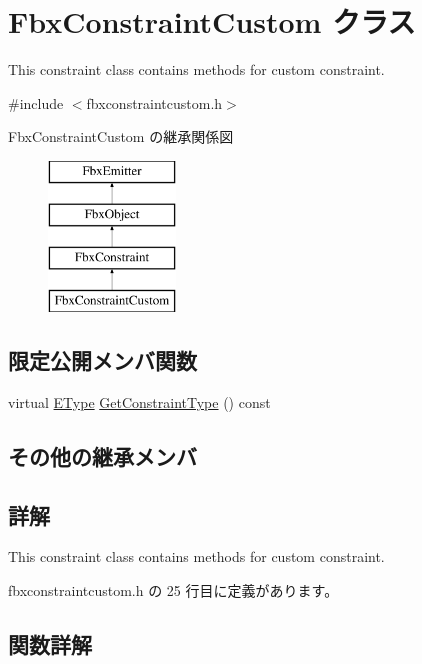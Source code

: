 \hypertarget{class_fbx_constraint_custom}{}\section{Fbx\+Constraint\+Custom クラス}
\label{class_fbx_constraint_custom}


This constraint class contains methods for custom constraint.  




{\ttfamily \#include $<$fbxconstraintcustom.\+h$>$}

Fbx\+Constraint\+Custom の継承関係図\begin{figure}[H]
\begin{center}
\leavevmode
\includegraphics[height=4.000000cm]{class_fbx_constraint_custom}
\end{center}
\end{figure}
\subsection*{限定公開メンバ関数}
\begin{DoxyCompactItemize}
\item 
virtual \hyperlink{class_fbx_constraint_a49c1634663395eab7c28856df233ec66}{E\+Type} \hyperlink{class_fbx_constraint_custom_a80bc6e130ef40b27e4621e1a54b22eb8}{Get\+Constraint\+Type} () const
\end{DoxyCompactItemize}
\subsection*{その他の継承メンバ}


\subsection{詳解}
This constraint class contains methods for custom constraint. 

 fbxconstraintcustom.\+h の 25 行目に定義があります。



\subsection{関数詳解}
\mbox{\label{class_fbx_constraint_custom_a80bc6e130ef40b27e4621e1a54b22eb8}} 
